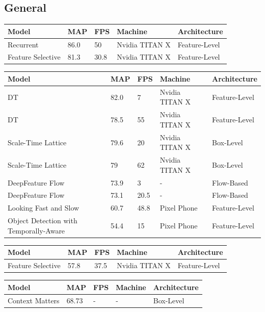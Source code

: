 \documentclass[conference]{IEEEtran}
\begin{document}
\subsection{General}
\begin{tabular}{ | p{2cm} | p{2em}| p{2em} | p{4em} | p{5em} | } 
 \hline
 Model & MAP & FPS & Machine & Architecture \\
 \hline
 Recurrent \cite{b1} & 86.0 & 50 & Nvidia TITAN X & Feature-Level \\
 \hline
 Feature Selective \cite{b6} & 81.3 & 30.8 & Nvidia TITAN X & Feature-Level \\
 \hline
\end{tabular}

\begin{tabular}{ | p{2cm} | p{2em}| p{2em} | p{4em} | p{5em} | } 
 \hline
 Model & MAP & FPS & Machine & Architecture \\
 \hline
 DT \cite{b8} & 82.0 & 7 & Nvidia TITAN X & Feature-Level \\
 \hline
 DT \cite{b8} & 78.5 & 55 & Nvidia TITAN X & Feature-Level \\
 \hline
 Scale-Time Lattice \cite{b10} & 79.6 & 20 & Nvidia TITAN X & Box-Level \\
 \hline
 Scale-Time Lattice \cite{b10} & 79 & 62 & Nvidia TITAN X & Box-Level \\
 \hline
 DeepFeature Flow \cite{b3} & 73.9 & 3 & - & Flow-Based \\
 \hline
 DeepFeature Flow \cite{b3} & 73.1 & 20.5 & - & Flow-Based \\
 \hline
 Looking Fast and Slow \cite{b7} & 60.7 & 48.8 & Pixel Phone & Feature-Level \\
 \hline
 Object Detection with Temporally-Aware \cite{b2} & 54.4 & 15 & Pixel Phone & Feature-Level \\
 \hline
\end{tabular}

\begin{tabular}{ | p{2cm} | p{2em}| p{2em} | p{4em} | p{5em} | } 
 \hline
 Model & MAP & FPS & Machine & Architecture \\
 \hline
 Feature Selective \cite{b6} & 57.8 & 37.5 & Nvidia TITAN X & Feature-Level \\
 \hline
\end{tabular}

\begin{tabular}{ | p{2cm} | p{2em}| p{2em} | p{4em} | p{5em} | } 
 \hline
 Model & MAP & FPS & Machine & Architecture \\
 \hline
 Context Matters \cite{b4} & 68.73 & - & - & Box-Level \\
 \hline
\end{tabular}
\end{document}
